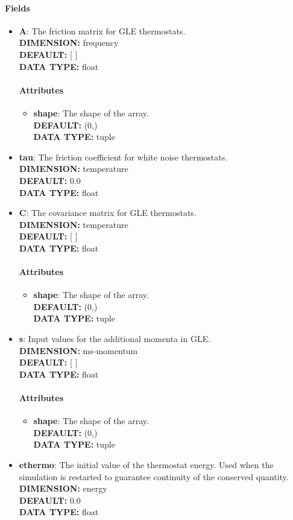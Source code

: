 \paragraph{Fields}
 \begin{itemize}
\item {\bf A}:
 The friction matrix for GLE thermostats.
{\\ \bf DIMENSION: }frequency
{\\ \bf DEFAULT: }[ ]
{\\ \bf DATA TYPE: }float
\paragraph{Attributes}
 \begin{itemize}
\item {\bf shape}:
 The shape of the array.
{\\ \bf DEFAULT: }(0,)
{\\ \bf DATA TYPE: }tuple
\end{itemize}
 
\item {\bf tau}:
 The friction coefficient for white noise thermostats.
{\\ \bf DIMENSION: }temperature
{\\ \bf DEFAULT: }0.0
{\\ \bf DATA TYPE: }float
\item {\bf C}:
 The covariance matrix for GLE thermostats.
{\\ \bf DIMENSION: }temperature
{\\ \bf DEFAULT: }[ ]
{\\ \bf DATA TYPE: }float
\paragraph{Attributes}
 \begin{itemize}
\item {\bf shape}:
 The shape of the array.
{\\ \bf DEFAULT: }(0,)
{\\ \bf DATA TYPE: }tuple
\end{itemize}
 
\item {\bf s}:
 Input values for the additional momenta in GLE.
{\\ \bf DIMENSION: }ms-momentum
{\\ \bf DEFAULT: }[ ]
{\\ \bf DATA TYPE: }float
\paragraph{Attributes}
 \begin{itemize}
\item {\bf shape}:
 The shape of the array.
{\\ \bf DEFAULT: }(0,)
{\\ \bf DATA TYPE: }tuple
\end{itemize}
 
\item {\bf ethermo}:
 The initial value of the thermostat energy. Used when the simulation is restarted to guarantee continuity of the conserved quantity.
{\\ \bf DIMENSION: }energy
{\\ \bf DEFAULT: }0.0
{\\ \bf DATA TYPE: }float
\end{itemize}
 
